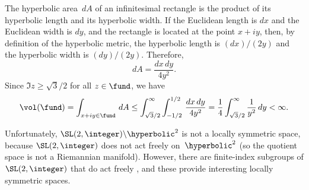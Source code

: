 \begin{eg}
%
%
%

The hyperbolic area~$dA$ of an infinitesimal rectangle is the product
of its hyperbolic length and its hyperbolic width. If the Euclidean
length is $dx$ and the Euclidean width is $dy$, and the rectangle is
located at the point $x + iy$, then, by definition of the hyperbolic
metric, the hyperbolic length is $(dx)/(2y)$ and the hyperbolic width
is $(dy)/(2y)$. Therefore, 
 $$ dA = \frac{dx \, dy}{4 y^2} .$$
 Since $\Im z \ge \sqrt{3}/2$ for all $z \in \fund$,
we have
 $$ \vol(\fund)
 = \int_{x + iy \in \fund} \, dA
 \le \int_{\sqrt{3}/2}^\infty \int_{-1/2}^{1/2} \, \frac{dx \, dy}{4
y^2}
 =  \frac{1}{4} \int_{\sqrt{3}/2}^\infty \frac{1}{y^2} \, dy 
 < \infty .$$

Unfortunately, $\SL(2,\integer) \backslash \hyperbolic^2$ is not a
locally symmetric space, because $\SL(2,\integer)$ does not act
freely on~$\hyperbolic^2$ (so the quotient space is not a Riemannian
manifold). However, there are finite-index subgroups of
$\SL(2,\integer)$ that do act freely , and these
provide interesting locally symmetric spaces.
 \end{eg}


